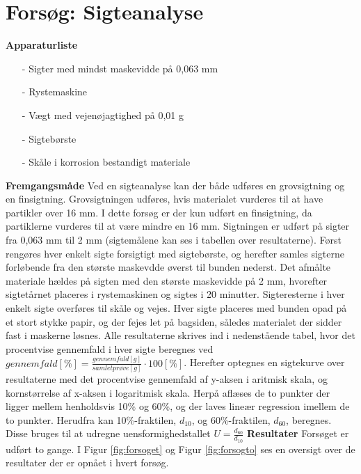 \chapter{Forsøg: Sigteanalyse}

\textbf{Apparaturliste}
\begin{itemize}
	\item[-] Sigter med mindst maskevidde på 0,063 mm
	\item[-] Rystemaskine
	\item[-] Vægt med vejenøjagtighed på 0,01 g
	\item[-] Sigtebørste
	\item[-] Skåle i korrosion bestandigt materiale
\end{itemize}
\textbf{Fremgangsmåde}
\newline
Ved en sigteanalyse kan der både udføres en grovsigtning og en finsigtning. Grovsigtningen udføres, hvis materialet vurderes til at have partikler over 16 mm. I dette forsøg er der kun udført en finsigtning, da partiklerne vurderes til at være mindre en 16 mm. Sigtningen er udført på sigter fra 0,063 mm til 2 mm (sigtemålene kan ses i tabellen over resultaterne). 
\newline \indent{     }   Først rengøres hver enkelt sigte forsigtigt med sigtebørste, og herefter samles sigterne forløbende fra den største maskevdde øverst til bunden nederst. Det afmålte materiale hældes på sigten med den største maskevidde på 2 mm, hvorefter sigtetårnet placeres i rystemaskinen og sigtes i 20 minutter.
\newline \indent{     }   Sigteresterne i hver enkelt sigte overføres til skåle og vejes. Hver sigte placeres med bunden opad på et stort stykke papir, og der fejes let på bagsiden, således materialet der sidder fast i maskerne løsnes.
\newline \indent{     }   Alle resultaterne skrives ind i nedenstående tabel, hvor det procentvise gennemfald i hver sigte beregnes ved $gennemfald [\%] = \frac{gennemfald [g]}{samlet prøve [g]}\cdot 100 [\%]$. Herefter optegnes en sigtekurve over resultaterne med det procentvise gennemfald af y-aksen i aritmisk skala, og kornstørrelse af x-aksen i logaritmisk skala. Herpå aflæses de to punkter der ligger mellem henholdsvis 10\% og 60\%, og der laves lineær regression imellem de to punkter. Herudfra kan 10\%-fraktilen, $d_{10}$, og 60\%-fraktilen, $d_{60}$, beregnes. Disse bruges til at udregne uensformighedstallet $U = \frac{d_{60}}{d_{10}}$
\newline
\newline
\textbf{Resultater}
\newline
\newline
Forsøget er udført to gange. I Figur \ref{fig:forsoget} og Figur \ref{fig:forsogto} ses en oversigt over de resultater der er opnået i hvert forsøg. 

